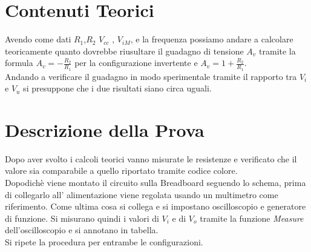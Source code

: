 \documentclass[12pt]{article}
\begin{document}
\section{Contenuti Teorici}
Avendo come dati $R_1$,$R_2$  $V_{cc}$ , $V_{iM}$, e la frequenza possiamo andare a calcolare
teoricamente quanto dovrebbe riusultare il guadagno di tensione $A_v$ tramite la formula
$A_v=-\frac{R_2}{R_1}$ per la configurazione invertente e $A_v=1+\frac{R_2}{R_1}$.\\
Andando a verificare il guadagno in modo sperimentale tramite il rapporto tra $V_i$ e $V_u$
si presuppone che i due risultati siano circa uguali.\\
\section{Descrizione della Prova}
Dopo aver svolto i calcoli teorici vanno misurate le resistenze e verificato che il valore sia 
comparabile a quello riportato tramite codice colore.\\
Dopodichè viene montato il circuito sulla Breadboard seguendo lo schema, prima di collegarlo all'
alimentazione viene regolata usando un multimetro come riferimento.
Come ultima cosa si collega e si impostano oscilloscopio e generatore di funzione.
Si misurano quindi i valori di $V_i$ e di $V_o$ tramite la funzione \textit{Measure} dell'oscilloscopio
e si annotano in tabella.\\
Si ripete la procedura per entrambe le configurazioni.\\
\end{document}
